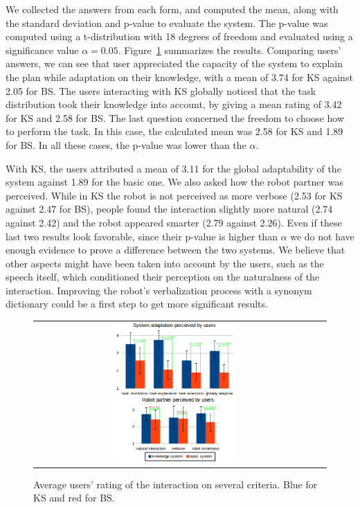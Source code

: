 We collected the answers from each form, and computed the mean, along with the standard deviation and p-value to evaluate the system. The p-value was computed using a t-distribution with 18 degrees of freedom and evaluated using a significance value $\alpha=0.05$.
Figure~\ref{fig:plan_management-results} summarizes the results. Comparing users' answers, we can see that user appreciated the capacity of the system to explain the plan while  adaptation on their knowledge, with a mean of 3.74 for KS against 2.05 for BS. The users interacting with KS globally noticed that the task distribution took their knowledge into account, by giving a mean rating of 3.42 for KS and 2.58 for BS. The last question concerned the freedom to choose how to perform the task. In this case, the calculated mean was 2.58 for KS and 1.89 for BS. In all these cases, the p-value was lower than the $\alpha$. 

With KS, the users attributed a mean of 3.11 for the global adaptability of the system against 1.89 for the basic one.
We also asked how the robot partner was perceived. While in KS the robot is not perceived as more verbose (2.53 for KS against 2.47 for BS), people found the interaction slightly more natural (2.74 against 2.42) and the robot appeared smarter (2.79 against 2.26). Even if these last two results look favorable, since their p-value is higher than $\alpha$  we do not have enough evidence to prove a difference between the two systems. We believe that other aspects might have been taken into account by the users, such as the speech itself, which conditioned their perception on the naturalness of the interaction. Improving the robot's verbalization process with a synonym dictionary could be a first step to get more significant results.



 \begin{figure}[ht!]
 \centering
 \begin{tabular}{cc}
  \includegraphics[width=0.45\textwidth]{img/plan_management/respvalue3.png}
 \end{tabular}
 \caption[Average users' rating of the interaction on several criteria]{Average users' rating of the interaction on several criteria. Blue for KS and red for BS.}
 \label{fig:plan_management-results}
 \end{figure}

